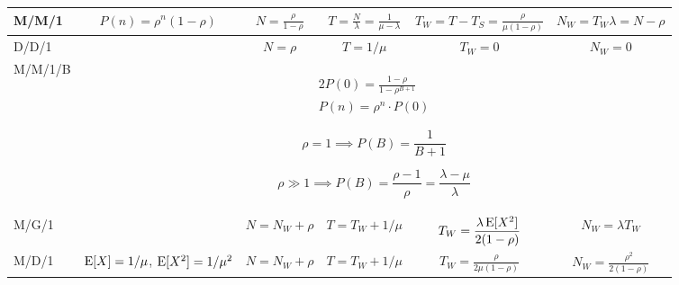 \documentclass{form}
\begin{document}
\begin{center}
    \begin{tabular}{@{}l || c | c | c | c | c @{}}
        M/M/1   & $\displaystyle P(n) = \rho^n(1-\rho)$   & $\displaystyle N=\frac{\rho}{1-\rho}$ & $\displaystyle T=\frac{N}{\lambda} = \frac{1}{\mu-\lambda}$ & $\displaystyle T_W = T-T_S = \frac{\rho}{\mu(1-\rho)}$ & $\displaystyle N_W = T_W \lambda = N-\rho$ \\ \hline
        D/D/1   &                                         & $\displaystyle N=\rho$                & $\displaystyle T=1/\mu$                                     & $\displaystyle T_W = 0$                                & $\displaystyle N_W = 0$                    \\ \hline
        M/M/1/B & \multicolumn{5}{c}{
            \begin{minipage}{0.15\textwidth}
                \vspace{-0.8em}
                \begin{alignat*}{2}
                    P(0) = \frac{1-\rho}{1-\rho^{B+1}} \\
                    P(n) = \rho^n\cdot P(0)
                \end{alignat*}
            \end{minipage}
            \begin{minipage}{0.35\textwidth}
                \vspace{-0.8em}
                \begin{equation*}
                    \rho = 1 \implies P(B) = \frac{1}{B+1}
                \end{equation*}
            \end{minipage}
            \begin{minipage}{0.30\textwidth}
                \vspace{-0.8em}
                \begin{equation*}
                    \rho \gg 1 \implies P(B) = \frac{\rho-1}{\rho} = \frac{\lambda-\mu}{\lambda}
                \end{equation*}
            \end{minipage}
        } \\ \hline
        M/G/1   &                                         & $\displaystyle N=N_W + \rho$                & $\displaystyle T=T_W+1/\mu$                             & $\displaystyle T_W = \frac{\lambda \operatorname{E}[X^2]}{2(1-\rho)}$                    & $\displaystyle N_W = \lambda T_W$                 \\ \hline
        M/D/1   & $\operatorname{E}[X]=1/\mu$, $\operatorname{E}[X^2]=1/\mu^2$ & $\displaystyle N=N_W + \rho$                & $\displaystyle T=T_W+1/\mu$                             & $\displaystyle T_W = \frac{\rho}{2 \mu (1-\rho)}$                    & $\displaystyle N_W = \frac{\rho^2}{2 (1-\rho)}$                 \\
    \end{tabular}
\end{center}
\end{document}

